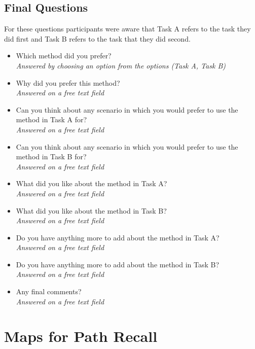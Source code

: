 \subsection{Final Questions}
For these questions participants were aware that Task A refers to the task they did first and Task B refers to the task that they did second.
\begin{itemize}
	\item Which method did you prefer?\\
	\textit{Answered by choosing an option from the options (Task A, Task B)}
	\item Why did you prefer this method?\\
	\textit{Answered on a free text field}
	\item Can you think about any scenario in which you would prefer to use the method in Task A for?\\
	\textit{Answered on a free text field}
	\item Can you think about any scenario in which you would prefer to use the method in Task B for?\\
	\textit{Answered on a free text field}
	\item What did you like about the method in Task A?\\
	\textit{Answered on a free text field}
	\item What did you like about the method in Task B?\\
	\textit{Answered on a free text field}
	\item Do you have anything more to add about the method in Task A?\\
	\textit{Answered on a free text field}
	\item Do you have anything more to add about the method in Task B?\\
	\textit{Answered on a free text field}
	\item Any final comments?\\
	\textit{Answered on a free text field}
\end{itemize}
\section{Maps for Path Recall}
\label{Appendix:Path Recall}

\label{Appendix:Sample Logging Data}

